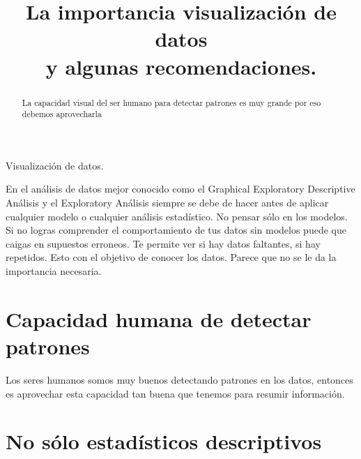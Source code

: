\documentclass[conference, a4paper]{IEEEtran_ID}
\begin{document}
\title{\huge{La importancia visualización de datos \\ 
y algunas recomendaciones.} %
}

\author{
\vspace{0.6em}
\vspace{0.1em}
}

\maketitle
\thispagestyle{fancy}

\begin{abstract}
La capacidad visual del ser humano para detectar patrones es muy grande por eso debemos aprovecharla
\end{abstract}

\begin{IEEEkeywords}
Visualización de datos. 
\end{IEEEkeywords}



En el análisis de datos mejor conocido como el Graphical Exploratory Descriptive Análisis y el Exploratory Análisis siempre se debe de hacer antes de aplicar cualquier modelo o cualquier análisis estadístico. No pensar sólo en los modelos. Si no logras comprender el comportamiento de tus datos sin modelos puede que caigas en supuestos erroneos. Te permite ver si hay datos faltantes, si hay repetidos. Esto con el objetivo de conocer los datos. Parece que no se le da la importancia necesaria. 

\section{Capacidad humana de detectar patrones }

Los seres humanos somos muy buenos detectando patrones en los datos, entonces es aprovechar esta capacidad tan buena que tenemos para resumir información. 

\section{No sólo estadísticos descriptivos}
\end{document}
